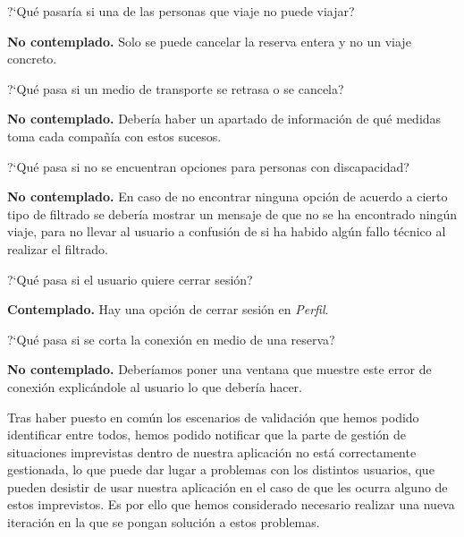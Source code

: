 \begin{escenario} %
    \centering
    ?`Qué pasaría si una de las personas que viaje no puede viajar?

    \begin{solucion}
        \centering
        \textbf{No contemplado.} Solo se puede cancelar la reserva entera y no un viaje concreto.
    \end{solucion}
\end{escenario}

\begin{escenario} %
    \centering
    ?`Qué pasa si un medio de transporte se retrasa o se cancela?

    \begin{solucion}
        \centering
        \textbf{No contemplado.} Debería haber un apartado de información de qué medidas toma cada compañía con estos sucesos.
    \end{solucion}
\end{escenario}

\begin{escenario} %
    \centering
    ?`Qué pasa si no se encuentran opciones para personas con discapacidad?

    \begin{solucion}
        \centering
        \textbf{No contemplado.} En caso de no encontrar ninguna opción de acuerdo a cierto tipo de
        filtrado se debería mostrar un mensaje de que no se ha encontrado ningún viaje, para no
        llevar al usuario a confusión de si ha habido algún fallo técnico al realizar el filtrado.
    \end{solucion}
\end{escenario}

\begin{escenario} %
    \centering
    ?`Qué pasa si el usuario quiere cerrar sesión?

    \begin{solucion}
        \centering
        \textbf{Contemplado.} Hay una opción de cerrar sesión en \textit{Perfil}.
    \end{solucion}
\end{escenario}

\begin{escenario} %
    \centering
    ?`Qué pasa si se corta la conexión en medio de una reserva?

    \begin{solucion}
        \centering
        \textbf{No contemplado.} Deberíamos poner una ventana que muestre este error de conexión explicándole al usuario lo que debería hacer.
    \end{solucion}
\end{escenario}

Tras haber puesto en común los escenarios de validación que hemos podido identificar entre todos, hemos podido notificar que la parte de gestión 
de situaciones imprevistas dentro de nuestra aplicación no está correctamente gestionada, lo que puede dar lugar a problemas con los distintos usuarios,
que pueden desistir de usar nuestra aplicación en el caso de que les ocurra alguno de estos imprevistos. Es por ello que hemos considerado necesario realizar
una nueva iteración en la que se pongan solución a estos problemas.